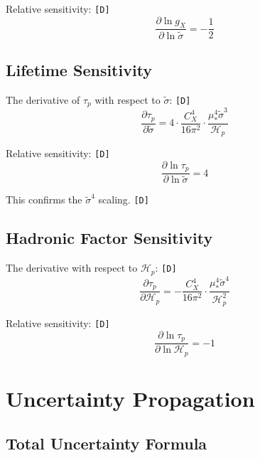 \documentclass[11pt,a4paper]{article}
\newcommand{\tagD}{\textcolor{green!50!black}{\texttt{[D]}}}
\theoremstyle{definition}
\begin{document}
Relative sensitivity: \tagD{}
\begin{equation}
\label{eq:app-sens-2}
\frac{\partial \ln g_X}{\partial \ln \tilde{\sigma}} = -\frac{1}{2}
\end{equation}

\subsection{Lifetime Sensitivity}
\label{app:lifetime-sensitivity}

The derivative of $\tau_p$ with respect to $\tilde{\sigma}$: \tagD{}
\begin{equation}
\label{eq:app-sens-3}
\frac{\partial \tau_p}{\partial \tilde{\sigma}} = 4 \cdot \frac{C_X^4}{16\pi^2} \cdot \frac{\mu_*^4 \tilde{\sigma}^3}{\mathcal{H}_p}
\end{equation}

Relative sensitivity: \tagD{}
\begin{equation}
\label{eq:app-sens-4}
\frac{\partial \ln \tau_p}{\partial \ln \tilde{\sigma}} = 4
\end{equation}

This confirms the $\tilde{\sigma}^4$ scaling. \tagD{}

\subsection{Hadronic Factor Sensitivity}
\label{app:hadronic-sensitivity}

The derivative with respect to $\mathcal{H}_p$: \tagD{}
\begin{equation}
\label{eq:app-sens-5}
\frac{\partial \tau_p}{\partial \mathcal{H}_p} = -\frac{C_X^4}{16\pi^2} \cdot \frac{\mu_*^4 \tilde{\sigma}^4}{\mathcal{H}_p^2}
\end{equation}

Relative sensitivity: \tagD{}
\begin{equation}
\label{eq:app-sens-6}
\frac{\partial \ln \tau_p}{\partial \ln \mathcal{H}_p} = -1
\end{equation}

\section{Uncertainty Propagation}
\label{app:uncertainty}

\subsection{Total Uncertainty Formula}
\label{app:total-uncertainty}
\end{document}
